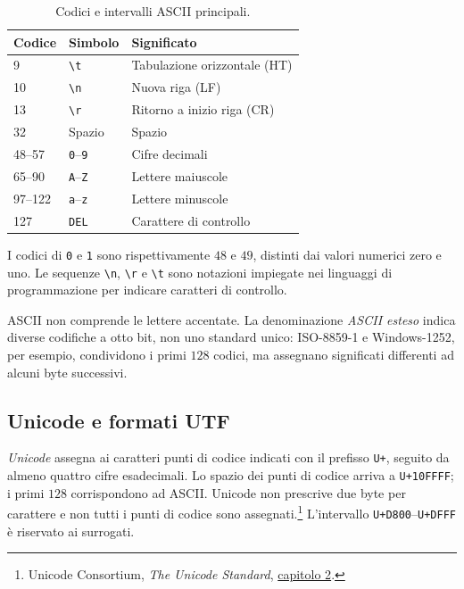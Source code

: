 \begin{table}[htbp]
  \centering
  \begin{tabular}{lll}
    \toprule
    Codice & Simbolo & Significato \\
    \midrule
    9 & \texttt{\textbackslash t} & Tabulazione orizzontale (HT) \\
    10 & \texttt{\textbackslash n} & Nuova riga (LF) \\
    13 & \texttt{\textbackslash r} & Ritorno a inizio riga (CR) \\
    32 & Spazio & Spazio \\
    48--57 & \texttt{0}--\texttt{9} & Cifre decimali \\
    65--90 & \texttt{A}--\texttt{Z} & Lettere maiuscole \\
    97--122 & \texttt{a}--\texttt{z} & Lettere minuscole \\
    127 & \texttt{DEL} & Carattere di controllo \\
    \bottomrule
  \end{tabular}
  \caption{Codici e intervalli ASCII principali.}
  \label{tab:fi-ascii}
\end{table}

I codici di \texttt{0} e \texttt{1} sono rispettivamente \(48\) e
\(49\), distinti dai valori numerici zero e uno. Le sequenze
\texttt{\textbackslash n}, \texttt{\textbackslash r} e
\texttt{\textbackslash t} sono notazioni impiegate nei linguaggi di
programmazione per indicare caratteri di controllo.

ASCII non comprende le lettere accentate. La denominazione
\emph{ASCII esteso} indica diverse codifiche a otto bit, non uno
standard unico: ISO-8859-1 e Windows-1252, per esempio, condividono
i primi \(128\) codici, ma assegnano significati differenti ad alcuni
byte successivi.

\subsection{Unicode e formati UTF}

\emph{Unicode} assegna ai caratteri punti di codice indicati con
il prefisso \texttt{U+}, seguito da almeno quattro cifre
esadecimali. Lo spazio dei punti di codice arriva a
\texttt{U+10FFFF}; i primi \(128\) corrispondono ad ASCII.
Unicode non prescrive due byte per carattere e non tutti i punti
di codice sono assegnati.\footnote{Unicode Consortium,
\emph{The Unicode Standard},
\href{https://www.unicode.org/versions/Unicode17.0.0/core-spec/chapter-2/}{capitolo 2}.}
L'intervallo \texttt{U+D800}--\texttt{U+DFFF} è riservato ai surrogati.

